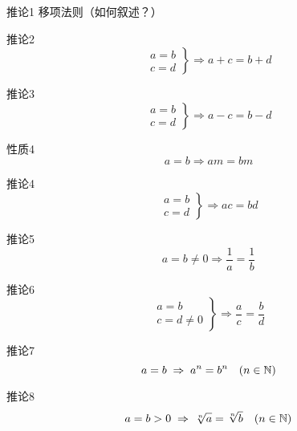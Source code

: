 \begin{thm}{推论1}
    移项法则（如何叙述？）
\end{thm}

\begin{thm}{推论2}
\[\left.\begin{array}{c}
    a=b\\
    c=d
\end{array}\right\} \Longrightarrow a+c=b+d\]
\end{thm}

\begin{thm}{推论3}
    \[\left.\begin{array}{c}
        a=b\\
        c=d
    \end{array}\right\} \Longrightarrow a-c=b-d\]
\end{thm}


\begin{thm}{性质4}
\begin{equation}
    a=b\Longrightarrow am=bm\tag{等量乘同量}
\end{equation}    
\end{thm}

\begin{thm}{推论4}
    \[\left.\begin{array}{c}
        a=b\\
        c=d
    \end{array}\right\} \Longrightarrow ac=bd\]    
\end{thm}

\begin{thm}{推论5}
    \[a=b\ne 0\Longrightarrow \frac{1}{a}=\frac{1}{b}\]
\end{thm}

\begin{thm}{推论6}
    \[\left.\begin{array}{c}
        a=b\\
        c=d\ne 0
    \end{array}\right\} \Longrightarrow \frac{a}{c}=\frac{b}{d}\]
\end{thm}

\begin{thm}{推论7}
    \[a=b\;\Rightarrow\; a^n=b^n\quad (n\in\mathbb{N})\]
\end{thm}

\begin{thm}{推论8}
    \[a=b>0\;\Rightarrow\; \sqrt[n]{a}=\sqrt[n]{b}\quad (n\in\mathbb{N})\]
\end{thm}

